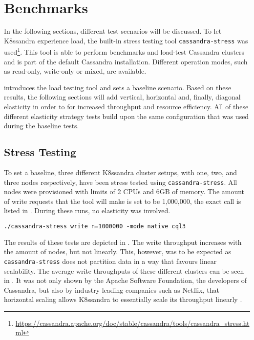 \section{Benchmarks}

In the following sections, different test scenarios will be discussed. To let K8ssandra experience load, the built-in stress testing tool \texttt{cassandra-stress} was used\footnote{\raggedright\url{https://cassandra.apache.org/doc/stable/cassandra/tools/cassandra_stress.html}}. This tool is able to perform benchmarks and load-test Cassandra clusters and is part of the default Cassandra installation. Different operation modes, such as read-only, write-only or mixed, are available.

 introduces the load testing tool and sets a baseline scenario. Based on these results, the following sections will add vertical, horizontal and, finally, diagonal elasticity in order to for increased throughput and resource efficiency. All of these different elasticity strategy tests build upon the same configuration that was used during the baseline tests.

\subsection{Stress Testing}
\label{sec:stress-testing}

To set a baseline, three different K8ssandra cluster setups, with one, two, and three nodes respectively, have been stress tested using \texttt{cassandra-stress}. All nodes were provisioned with limits of 2 CPUs and 6GB of memory. The amount of write requests that the tool will make is set to be 1,000,000, the exact call is listed in . During these runs, no elasticity was involved.

\begin{lstlisting}[caption={Call of the \texttt{cassandra-stress} tool that triggers 1000000 writes.},
                    captionpos=b,
                    label=lst:stress-1000000writes,
                    float]
./cassandra-stress write n=1000000 -mode native cql3
\end{lstlisting}

The results of these tests are depicted in . The write throughput increases with the amount of nodes, but not linearly. This, however, was to be expected as \texttt{cassandra-stress} does not partition data in a way that favours linear scalability. The average write throughputs of these different clusters can be seen in . It was not only shown by the Apache Software Foundation, the developers of Cassandra, but also by industry leading companies such as Netflix, that horizontal scaling allows K8ssandra to essentially scale its throughput linearly \cite{cockroftBenchmarkingCassandraScalability2011}.

